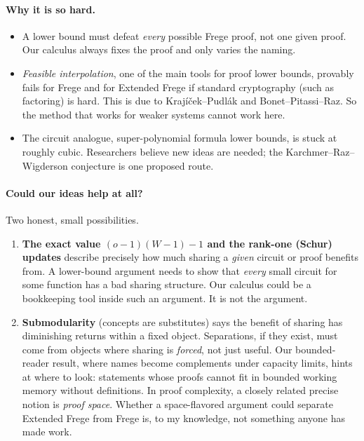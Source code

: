 \documentclass[11pt]{article}
\theoremstyle{remark}
\begin{document}
\paragraph{Why it is so hard.}
\begin{itemize}
\item A lower bound must defeat \emph{every} possible Frege proof, not one given proof.
  Our calculus always fixes the proof and only varies the naming.
\item \emph{Feasible interpolation}, one of the main tools for proof lower bounds, provably
  fails for Frege and for Extended Frege if standard cryptography (such as factoring) is
  hard. This is due to Kraj\'i\v{c}ek--Pudl\'ak and Bonet--Pitassi--Raz. So the method
  that works for weaker systems cannot work here.
\item The circuit analogue, super-polynomial formula lower bounds, is stuck at roughly
  cubic. Researchers believe new ideas are needed; the Karchmer--Raz--Wigderson
  conjecture is one proposed route.
\end{itemize}

\paragraph{Could our ideas help at all?} Two honest, small possibilities.
\begin{enumerate}
\item \textbf{The exact value $(o-1)(W-1)-1$ and the rank-one (Schur) updates} describe
  precisely how much sharing a \emph{given} circuit or proof benefits from. A lower-bound
  argument needs to show that \emph{every} small circuit for some function has a bad
  sharing structure. Our calculus could be a bookkeeping tool inside such an argument. It
  is not the argument.
\item \textbf{Submodularity} (concepts are substitutes) says the benefit of sharing has
  diminishing returns within a fixed object. Separations, if they exist, must come from
  objects where sharing is \emph{forced}, not just useful. Our bounded-reader result,
  where names become complements under capacity limits, hints at where to look:
  statements whose proofs cannot fit in bounded working memory without definitions. In
  proof complexity, a closely related precise notion is \emph{proof space}. Whether a
  space-flavored argument could separate Extended Frege from Frege is, to my knowledge,
  not something anyone has made work.
\end{enumerate}
\end{document}
